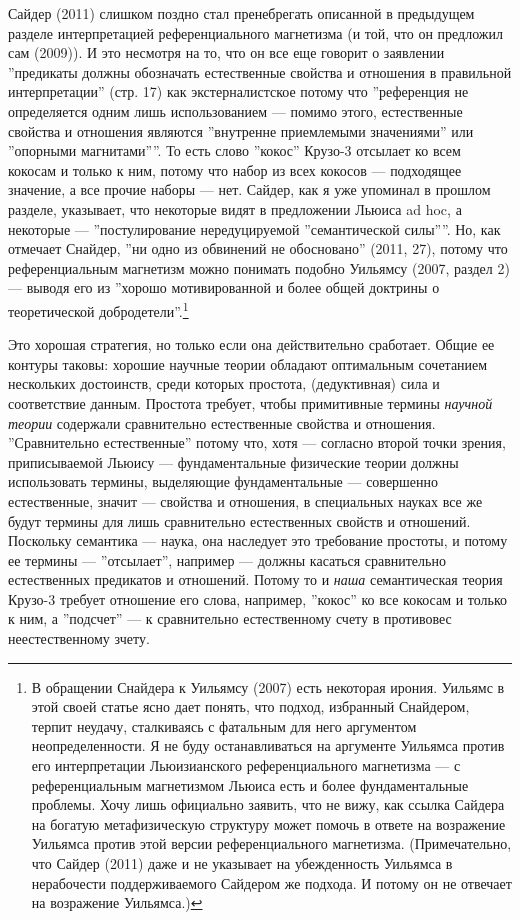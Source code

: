 \documentclass[11pt]{book}
\begin{document}
Сайдер (2011) слишком поздно стал пренебрегать описанной в предыдущем разделе интерпретацией референциального магнетизма (и той, что он предложил сам (2009)). И это несмотря на то, что он все еще говорит о заявлении ''предикаты должны обозначать естественные свойства и отношения в правильной интерпретации'' (стр. 17) как экстерналистское потому что ''референция не определяется одним лишь использованием --- помимо этого, естественные свойства и отношения являются ''внутренне приемлемыми значениями'' или ''опорными магнитами''''. То есть слово ''кокос'' Крузо-3 отсылает ко всем кокосам и только к ним, потому что набор из всех кокосов --- подходящее значение, а все прочие наборы --- нет. Сайдер, как я уже упоминал в прошлом разделе, указывает, что некоторые видят в предложении Льюиса ad hoc, а некоторые --- ''постулирование нередуцируемой ''семантической силы''''. Но, как отмечает Снайдер, ''ни одно из обвинений не обосновано'' (2011, 27), потому что референциальным магнетизм можно понимать подобно Уильямсу (2007, раздел 2) --- выводя его из ''хорошо мотивированной и более общей доктрины о теоретической добродетели''.\footnote{В обращении Снайдера к Уильямсу (2007) есть некоторая ирония. Уильямс в этой своей статье ясно дает понять, что подход, избранный Снайдером, терпит неудачу, сталкиваясь с фатальным для него аргументом неопределенности. Я не буду останавливаться на аргументе Уильямса против его интерпретации Льюизианского референциального магнетизма --- с референциальным магнетизмом Льюиса есть и более фундаментальные проблемы. Хочу лишь официально заявить, что не вижу, как ссылка Сайдера на богатую метафизическую структуру может помочь в ответе на возражение Уильямса против этой версии референциального магнетизма. (Примечательно, что Сайдер (2011) даже и не указывает на убежденность Уильямса в нерабочести поддерживаемого Сайдером же подхода. И потому он не отвечает на возражение Уильямса.)}

Это хорошая стратегия, но только если она действительно сработает. Общие ее контуры таковы: хорошие научные теории обладают оптимальным сочетанием нескольких достоинств, среди которых простота, (дедуктивная) сила и соответствие данным. Простота требует, чтобы примитивные термины \textit{научной теории} содержали сравнительно естественные свойства и отношения. ''Сравнительно естественные'' потому что, хотя --- согласно второй точки зрения, приписываемой Льюису --- фундаментальные физические теории должны использовать термины, выделяющие фундаментальные --- совершенно естественные, значит --- свойства и отношения, в специальных науках все же будут термины для лишь сравнительно естественных свойств и отношений. Поскольку семантика --- наука, она наследует это требование простоты, и потому ее термины --- ''отсылает'', например --- должны касаться сравнительно естественных предикатов и отношений. Потому то и \textit{наша} семантическая теория Крузо-3 требует отношение его слова, например, ''кокос'' ко все кокосам и только к ним, а ''подсчет'' --- к сравнительно естественному счету в противовес неестественному зчету.
\end{document}
